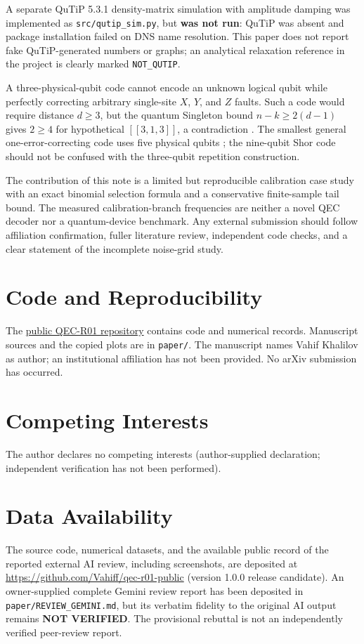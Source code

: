\documentclass[11pt,a4paper]{article}
\begin{document}
A separate QuTiP 5.3.1 density-matrix simulation with amplitude damping was implemented as \texttt{src/qutip\_sim.py}, but \textbf{was not run}: QuTiP was absent and package installation failed on DNS name resolution. This paper does not report fake QuTiP-generated numbers or graphs; an analytical relaxation reference in the project is clearly marked \texttt{NOT\_QUTIP}.

A three-physical-qubit code cannot encode an unknown logical qubit while perfectly correcting arbitrary single-site $X$, $Y$, and $Z$ faults. Such a code would require distance $d\ge3$, but the quantum Singleton bound $n-k\ge2(d-1)$ gives $2\ge4$ for hypothetical $[[3,1,3]]$, a contradiction \cite{gottesman1997}. The smallest general one-error-correcting code uses five physical qubits \cite{laflamme1996}; the nine-qubit Shor code should not be confused with the three-qubit repetition construction.

The contribution of this note is a limited but reproducible calibration case study with an exact binomial selection formula and a conservative finite-sample tail bound. The measured calibration-branch frequencies are neither a novel QEC decoder nor a quantum-device benchmark. Any external submission should follow affiliation confirmation, fuller literature review, independent code checks, and a clear statement of the incomplete noise-grid study.

\section*{Code and Reproducibility}
The \href{https://github.com/Vahiff/qec-r01-public}{public QEC-R01 repository} contains code and numerical records. Manuscript sources and the copied plots are in \texttt{paper/}. The manuscript names Vahif Khalilov as author; an institutional affiliation has not been provided. No arXiv submission has occurred.

\printbibliography[heading=bibintoc,title={References}]
\section*{Competing Interests}
The author declares no competing interests (author-supplied declaration; independent verification has not been performed).

\section*{Data Availability}
The source code, numerical datasets, and the available public record of the reported external AI review, including screenshots, are deposited at
\url{https://github.com/Vahiff/qec-r01-public} (version 1.0.0 release candidate).
An owner-supplied complete Gemini review report has been deposited in \texttt{paper/REVIEW\_GEMINI.md}, but its verbatim fidelity to the original AI output remains \textbf{NOT VERIFIED}. The provisional rebuttal is not an independently verified peer-review report.
\end{document}
